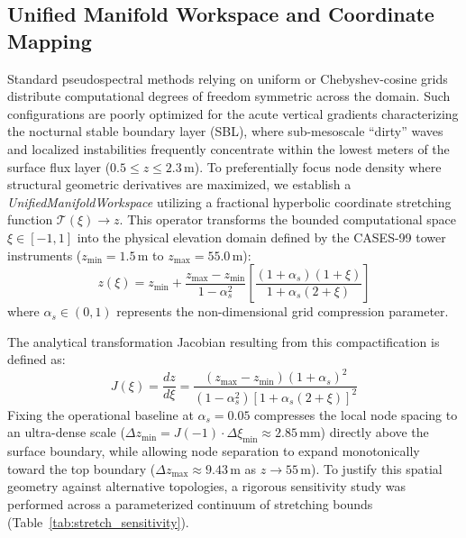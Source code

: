 \documentclass[11pt,a4paper]{article}
\begin{document}
\subsection{Unified Manifold Workspace and Coordinate Mapping}
\label{sec:methods:manifold}

Standard pseudospectral methods relying on uniform or Chebyshev-cosine grids distribute computational degrees of freedom symmetric across the domain. Such configurations are poorly optimized for the acute vertical gradients characterizing the nocturnal stable boundary layer (SBL), where sub-mesoscale ``dirty'' waves and localized instabilities frequently concentrate within the lowest meters of the surface flux layer ($0.5 \le z \le 2.3\,\text{m}$). To preferentially focus node density where structural geometric derivatives are maximized, we establish a \emph{UnifiedManifoldWorkspace} utilizing a fractional hyperbolic coordinate stretching function $\mathcal{T}(\xi) \rightarrow z$. This operator transforms the bounded computational space $\xi \in [-1, 1]$ into the physical elevation domain defined by the CASES-99 tower instruments ($z_{\min} = 1.5\,\text{m}$ to $z_{\max} = 55.0\,\text{m}$):
\begin{equation}
z(\xi) = z_{\min} + \frac{z_{\max} - z_{\min}}{1 - \alpha_s^2} \left[ \frac{(1+\alpha_s)(1+\xi)}{1 + \alpha_s(2+\xi)} \right]
\label{eq:hyperbolic_stretch}
\end{equation}
where $\alpha_s \in (0, 1)$ represents the non-dimensional grid compression parameter.

The analytical transformation Jacobian resulting from this compactification is defined as:
\begin{equation}
J(\xi) = \frac{dz}{d\xi} = \frac{(z_{\max} - z_{\min})(1 + \alpha_s)^2}{(1 - \alpha_s^2) \left[1 + \alpha_s(2+\xi)\right]^2}
\label{eq:jacobian_stretched}
\end{equation}
Fixing the operational baseline at $\alpha_s = 0.05$ compresses the local node spacing to an ultra-dense scale ($\Delta z_{\min} = J(-1) \cdot \Delta \xi_{\min} \approx 2.85\,\text{mm}$) directly above the surface boundary, while allowing node separation to expand monotonically toward the top boundary ($\Delta z_{\max} \approx 9.43\,\text{m}$ as $z \rightarrow 55\,\text{m}$). To justify this spatial geometry against alternative topologies, a rigorous sensitivity study was performed across a parameterized continuum of stretching bounds (Table~\ref{tab:stretch_sensitivity}).
\end{document}
